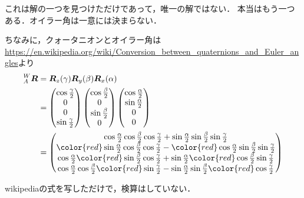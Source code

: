 これは解の一つを見つけただけであって，唯一の解ではない．
本当はもう一つある．オイラー角は一意には決まらない．

ちなみに，クォータニオンとオイラー角は \url{https://en.wikipedia.org/wiki/Conversion_between_quaternions_and_Euler_angles}より
\begin{align}
  {}^{W}_{A}\boldsymbol{R} &= \boldsymbol{R}_{z}(\gamma) \boldsymbol{R}_{y}(\beta) \boldsymbol{R}_{x}(\alpha)\\
  &=
  \begin{pmatrix}
    \cos \frac{\gamma}{2}\\
    0\\
    0\\
    \sin \frac{\gamma}{2}
  \end{pmatrix}
  \begin{pmatrix}
    \cos \frac{\beta}{2}\\
    0\\
    \sin \frac{\beta}{2}\\
    0
  \end{pmatrix}
  \begin{pmatrix}
    \cos \frac{\alpha}{2}\\
    \sin \frac{\alpha}{2}\\
    0\\
    0
  \end{pmatrix}\\
  &=
  \begin{pmatrix}
    \cos \frac{\alpha}{2} \cos \frac{\beta}{2} \cos \frac{\gamma}{2} + \sin \frac{\alpha}{2} \sin \frac{\beta}{2} \sin \frac{\gamma}{2}\\
         {\color{red} \sin \frac{\alpha}{2}} \cos \frac{\beta}{2} \cos \frac{\gamma}{2} - {\color{red} \cos \frac{\alpha}{2}} \sin \frac{\beta}{2} \sin \frac{\gamma}{2}\\
         \cos \frac{\alpha}{2} {\color{red} \sin \frac{\beta}{2}} \cos \frac{\gamma}{2} + \sin \frac{\alpha}{2} {\color{red} \cos \frac{\beta}{2}} \sin \frac{\gamma}{2}\\
         \cos \frac{\alpha}{2} \cos \frac{\beta}{2} {\color{red} \sin \frac{\gamma}{2}} - \sin \frac{\alpha}{2} \sin \frac{\beta}{2} {\color{red} \cos \frac{\gamma}{2}}
  \end{pmatrix}
\end{align}

wikipediaの式を写しただけで，検算はしていない．
